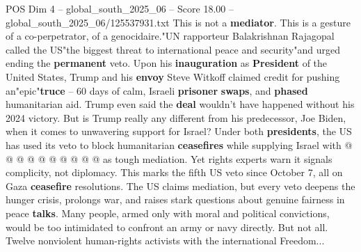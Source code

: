 \begin{textsample}{POS Dim 4 – global\_south\_2025\_06 – Score 18.00 – global\_south\_2025\_06/125537931.txt}
This is not a \textbf{mediator}.
This is a gesture of a co-perpetrator, of a genocidaire."UN rapporteur Balakrishnan Rajagopal called the US"the biggest threat to international peace and security"and urged ending the \textbf{permanent} veto.
Upon his \textbf{inauguration} as \textbf{President} of the United States, Trump and his \textbf{envoy} Steve Witkoff claimed credit for pushing an"epic"\textbf{truce} -- 60 days of calm, Israeli \textbf{prisoner} \textbf{swaps}, and \textbf{phased} humanitarian aid.
Trump even said the \textbf{deal} wouldn't have happened without his 2024 victory.
But is Trump really any different from his predecessor, Joe Biden, when it comes to unwavering support for Israel?
Under both \textbf{presidents}, the US has used its veto to block humanitarian \textbf{ceasefires} while supplying Israel with @ @ @ @ @ @ @ @ @ @ as tough mediation.
Yet rights experts warn it signals complicity, not diplomacy.
This marks the fifth US veto since October 7, all on Gaza \textbf{ceasefire} resolutions.
The US claims mediation, but every veto deepens the hunger crisis, prolongs war, and raises stark questions about genuine fairness in peace \textbf{talks}.
Many people, armed only with moral and political convictions, would be too intimidated to confront an army or navy directly.
But not all.
Twelve nonviolent human-rights activists with the international Freedom...

\end{textsample}

